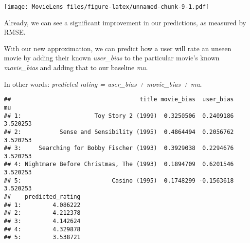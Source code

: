 \documentclass[
]{article}
\newenvironment{Shaded}{\begin{snugshade}}{\end{snugshade}}
\newcommand{\DataTypeTok}[1]{\textcolor[rgb]{0.13,0.29,0.53}{#1}}
\newcommand{\DecValTok}[1]{\textcolor[rgb]{0.00,0.00,0.81}{#1}}
\newcommand{\KeywordTok}[1]{\textcolor[rgb]{0.13,0.29,0.53}{\textbf{#1}}}
\newcommand{\NormalTok}[1]{#1}
\newcommand{\OperatorTok}[1]{\textcolor[rgb]{0.81,0.36,0.00}{\textbf{#1}}}
\newcommand{\StringTok}[1]{\textcolor[rgb]{0.31,0.60,0.02}{#1}}
\begin{document}
\texttt{[image: MovieLens\_files/figure-latex/unnamed-chunk-9-1.pdf]}

\begin{Shaded}
\end{Shaded}

Already, we can see a significant improvement in our predictions, as
measured by RMSE.

With our new approximation, we can predict how a user will rate an
unseen movie by adding their known \emph{user\_bias} to the particular
movie's known \emph{movie\_bias} and adding that to our baseline
\emph{mu}.

In other words: \emph{predicted rating = user\_bias + movie\_bias + mu}.

\begin{Shaded}
\end{Shaded}

\begin{verbatim}
##                                     title movie_bias  user_bias       mu
## 1:                     Toy Story 2 (1999)  0.3250506  0.2409186 3.520253
## 2:           Sense and Sensibility (1995)  0.4864494  0.2056762 3.520253
## 3:     Searching for Bobby Fischer (1993)  0.3929038  0.2294676 3.520253
## 4: Nightmare Before Christmas, The (1993)  0.1894709  0.6201546 3.520253
## 5:                          Casino (1995)  0.1748299 -0.1563618 3.520253
##    predicted_rating
## 1:         4.086222
## 2:         4.212378
## 3:         4.142624
## 4:         4.329878
## 5:         3.538721
\end{verbatim}
\end{document}
